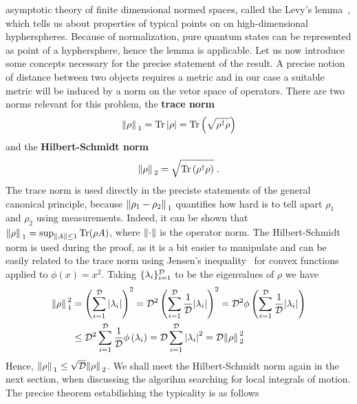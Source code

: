 asymptotic theory of finite dimensional normed spaces, called the Levy's lemma~\autocite{VitaliD.Milman1986}, which
tells us about properties of typical points on on high-dimensional hypherspheres. Because of normalization, pure quantum states
can be represented as point of a hyphersphere, hence the lemma is applicable.
Let us now
introduce some concepts necessary for the precise statement of the result. A precise notion of distance between two objects requires a metric and in
our case a suitable metric will be induced by a norm on the vetor space of operators. There are two norms relevant
for this problem, the \textbf{trace norm}
\begin{equation}
	\norm*{\rho}_1 = \Tr\abs{\rho} = \Tr\left(\sqrt{\rho^{\dagger}\rho}\right)
\end{equation}
and the \textbf{Hilbert-Schmidt norm}
\begin{equation}
	\norm*{\rho}_2 = \sqrt{\Tr\left(\rho^{\dagger}\rho\right)}\;.
\end{equation}
The trace norm is used directly in the preciste statements of the general canonical principle, because
\(\norm*{\rho_1 - \rho_2}_1\) quantifies how hard is to tell apart \(\rho_1\) and \(\rho_2\) using measurements.
Indeed, it can be shown that \(\norm*{\rho}_1 = \mathrm{sup}_{\norm{A}\leq 1} \Tr(\rho A)\), where \(\norm{\cdot}\) is the operator norm.
The Hilbert-Schmidt norm is used during the proof, as it is a bit easier to manipulate and can be easily related to the
trace norm using Jensen's inequality~\autocite{Jensen1906} for convex functions applied to \(\phi(x) = x^2\). Taking \(\{\lambda_i\}_{i=1}^{\mathcal{D}}\) to be
the eigenvalues of \(\rho\) we have
\begin{align}
	\norm*{\rho}_1^2 &= \left(\sum_{i=1}^{\mathcal{D}}\abs{\lambda_i}\right)^2 = \mathcal{D}^2  \left(\sum_{i=1}^{\mathcal{D}}\frac{1}{\mathcal{D}}\abs{\lambda_i}\right)^2 
	= \mathcal{D}^2 \phi\left(\sum_{i=1}^{\mathcal{D}}\frac{1}{\mathcal{D}}\abs{\lambda_i}\right) \nonumber \\
	&\leq  {\mathcal{D}}^2 \sum_{i=1}^{\mathcal{D}}\frac{1}{\mathcal{D}} \phi\left(\lambda_i\right) 
	= \mathcal{D} \sum_{i=1}^{\mathcal{D}} \abs{\lambda_i}^2 = \mathcal{D} \norm*{\rho}_2^2
\end{align}
Hence, \(\norm*{\rho}_1 \leq \sqrt{\mathcal{D}}\norm*{\rho}_2\). We shall meet the Hilbert-Schmidt norm again in the next section,
when discussing the algorihm searching for local integrals of motion. 
The precise theorem estabilishing the typicality is as follows
